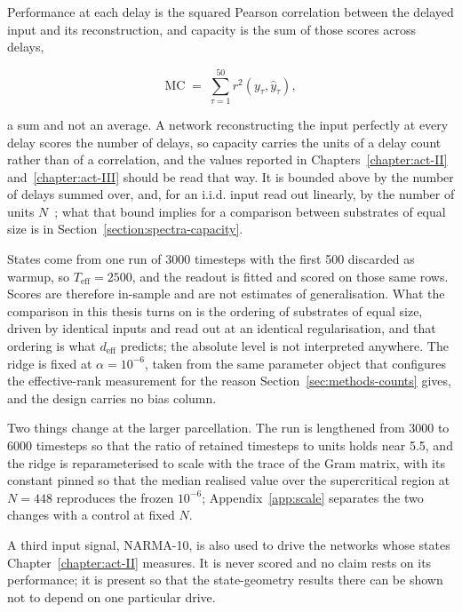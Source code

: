 Performance at each delay is the squared Pearson correlation between the
delayed input and its reconstruction, and capacity is the sum of those scores
across delays,

\begin{equation}
    \mathrm{MC} \;=\; \sum_{\tau=1}^{50} r^{2}\!\left(y_{\tau}, \hat{y}_{\tau}\right),
    \label{eq:memory_capacity}
\end{equation}

a sum and not an average. A network reconstructing the input perfectly at every
delay scores the number of delays, so capacity carries the units of a delay
count rather than of a correlation, and the values reported in
Chapters~\ref{chapter:act-II} and~\ref{chapter:act-III} should be read that way.
It is bounded above by the number of delays summed over, and, for an i.i.d.
input read out linearly, by the number of units
$N$~\cite{jaeger2001short, dambre2012information}; what that bound implies for a
comparison between substrates of equal size is in
Section~\ref{section:spectra-capacity}.

States come from one run of
3000 timesteps with the first 500 discarded as warmup, %
so $T_{\mathrm{eff}} = 2500$, and the readout is fitted and scored on those same
rows. Scores are therefore in-sample and are not estimates of generalisation.
What the comparison in this thesis turns on is the ordering of substrates of
equal size, driven by identical inputs and read out at an identical
regularisation, and that ordering is what $d_{\mathrm{eff}}$ predicts; the
absolute level is not interpreted anywhere. The ridge is fixed at
$\alpha = 10^{-6}$, %
taken from the same parameter object that configures the effective-rank
measurement for the reason Section~\ref{sec:methods-counts} gives, and the
design carries no bias column.

Two things change at the larger parcellation. The run is lengthened from
3000 to 6000 timesteps %
so that the ratio of retained timesteps to units holds near
5.5, %
and the ridge is reparameterised to scale with the trace of the Gram matrix,
with its constant pinned so that the median realised value over the
supercritical region at $N = 448$ reproduces the frozen
$10^{-6}$; %
Appendix~\ref{app:scale} separates the two changes with a control at fixed $N$.

A third input signal, NARMA-10, is also used to drive the networks whose states
Chapter~\ref{chapter:act-II} measures. It is never scored and no claim rests on
its performance; it is present so that the state-geometry results there can be
shown not to depend on one particular drive.





